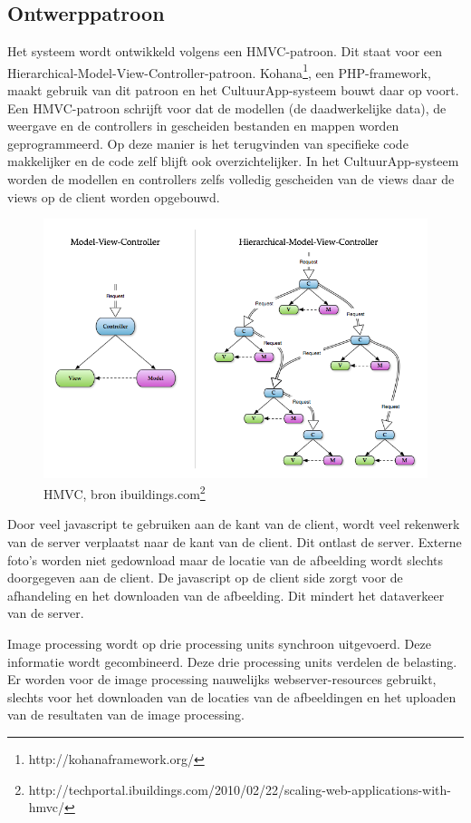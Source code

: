 \documentclass[a4paper,10pt]{article}
\begin{document}
	\subsection{Ontwerppatroon}
	\begin{itemize}
Het systeem wordt ontwikkeld volgens een HMVC-patroon. Dit staat voor een Hierarchical-Model-View-Controller-patroon. Kohana\footnote{http://kohanaframework.org/}, een PHP-framework, maakt gebruik van dit patroon en het CultuurApp-systeem bouwt daar op voort. Een HMVC-patroon schrijft voor dat de modellen (de daadwerkelijke data), de weergave en de controllers in gescheiden bestanden en mappen worden geprogrammeerd. Op deze manier is het terugvinden van specifieke code makkelijker en de code zelf blijft ook overzichtelijker. In het CultuurApp-systeem worden de modellen en controllers zelfs volledig gescheiden van de views daar de views op de client worden opgebouwd.
		\begin{figure}[ht!]
		\centering
		\includegraphics[width=12cm]{MVC-HMVC.png}
		\caption{\label{hmvc}HMVC, bron ibuildings.com\footnote{http://techportal.ibuildings.com/2010/02/22/scaling-web-applications-with-hmvc/}}
		\end{figure}
	
		Door veel javascript te gebruiken aan de kant van de client, wordt veel rekenwerk van de server verplaatst naar de kant van de client. Dit ontlast de server. Externe foto's worden niet gedownload maar de locatie van de afbeelding wordt slechts doorgegeven aan de client. De javascript op de client side zorgt voor de afhandeling en het downloaden van de afbeelding. Dit mindert het dataverkeer van de server.
	
		Image processing wordt op drie processing units synchroon uitgevoerd. Deze informatie wordt gecombineerd. Deze drie processing units verdelen de belasting. Er worden voor de image processing nauwelijks webserver-resources gebruikt, slechts voor het downloaden van de locaties van de afbeeldingen en het uploaden van de resultaten van de image processing.
	\end{itemize}
\end{document}
